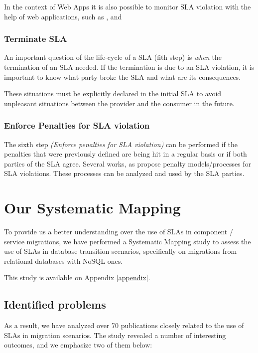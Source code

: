 In the context of Web Apps it is also possible to monitor SLA violation with the help of web applications, such as \cite{datadog}, \cite{appsee} and \cite{newrelic}

\subsubsection{Terminate SLA}
An important question of the life-cycle of a SLA (fith step) is \textit{when} the termination of an SLA needed. If the termination is due to an SLA violation, it is important to know what party broke the SLA and what are its consequences.

These situations must be explicitly declared in the initial SLA to avoid unpleasant situations between the provider and the consumer in the future.

\subsubsection{Enforce Penalties for SLA violation}
The sixth step \textit{(Enforce penalties for SLA violation)} can be performed if the penalties that were previously defined are being hit in a regular basis or if both parties of the SLA agree. Several works, as \cite{Lee:2010:PSR:1844765.1845204} propose penalty models/processes for SLA violations. These processes can be analyzed and used by the SLA parties. 

\section{Our Systematic Mapping}

To provide us a better understanding over the use of SLAs in component / service migrations, we have performed a Systematic Mapping study to assess the use of SLAs in database transition scenarios, specifically on migrations from relational databases with NoSQL ones. 

This study is available on Appendix \ref{appendix}. 

\subsection{Identified problems}

As a result, we have analyzed over 70 publications closely related to the use of SLAs in migration scenarios. The study revealed a number of interesting outcomes, and we emphasize two of them below:

